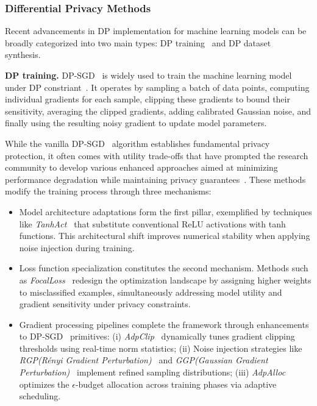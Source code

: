 \documentclass{article}
\begin{document}
\subsubsection{Differential Privacy Methods}\label{app:method_selection}

Recent advancements in DP implementation for machine learning models can be broadly categorized into two main types: DP training~\cite{wei2023dpmlbench} and DP dataset synthesis.~\cite{gong2025dpimagebench}

\noindent \textbf{DP training.} DP-SGD~\cite{abadi2016deep} is widely used to train the machine learning model under DP constriant~\cite{dwork2008differential}. It operates by sampling a batch of data points, computing individual gradients for each sample, clipping these gradients to bound their sensitivity, averaging the clipped gradients, adding calibrated Gaussian noise, and finally using the resulting noisy gradient to update model parameters.

While the vanilla DP-SGD~\cite{abadi2016deep} algorithm establishes fundamental privacy protection, it often comes with utility trade-offs that have prompted the research community to develop various enhanced approaches aimed at minimizing performance degradation while maintaining privacy guarantees~\cite{valdez2019users}. These methods modify the training process through three mechanisms: 
\begin{itemize}[leftmargin=*]
\item Model architecture adaptations form the first pillar, exemplified by techniques like \textit{TanhAct~\cite{papernot2021tempered}} that substitute conventional ReLU activations with tanh functions. This architectural shift improves numerical stability when applying noise injection during training.

\item Loss function specialization constitutes the second mechanism. Methods such as \textit{FocalLoss~\cite{shamsabadi2023losing}} redesign the optimization landscape by assigning higher weights to misclassified examples, simultaneously addressing model utility and gradient sensitivity under privacy constraints.

\item Gradient processing pipelines complete the framework through enhancements to DP-SGD~\cite{abadi2016deep} primitives: 
(i) \textit{AdpClip~\cite{andrew2021differentially}} dynamically tunes gradient clipping thresholds using real-time norm statistics; 
(ii) Noise injection strategies like \textit{RGP(Rényi Gradient Perturbation)~\cite{yu2021large}} and \textit{GGP(Gaussian Gradient Perturbation)~\cite{yu2021not}} implement refined sampling distributions; 
(iii) \textit{AdpAlloc~\cite{yu2019differentially}} optimizes the $\epsilon$-budget allocation across training phases via adaptive scheduling.
\end{itemize}
\end{document}
